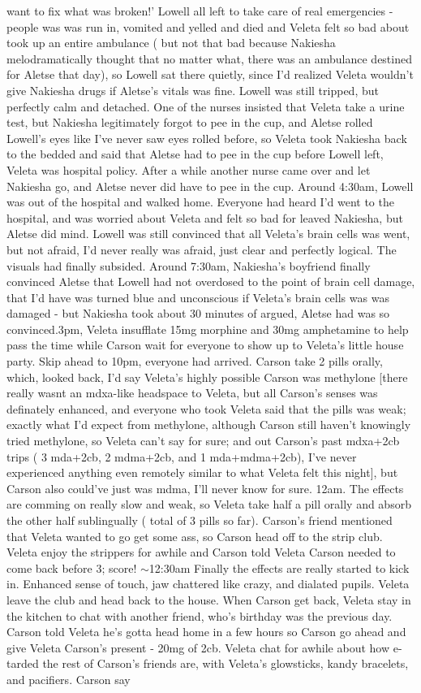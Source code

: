 \documentclass[12pt]{book}
\begin{document}
want to fix what was broken!' Lowell all left to take care of real emergencies - people was was run in, vomited and yelled and died and Veleta felt so bad about took up an entire ambulance ( but not that bad because Nakiesha melodramatically thought that no matter what, there was an ambulance destined for Aletse that day), so Lowell sat there quietly, since I'd realized Veleta wouldn't give Nakiesha drugs if Aletse's vitals was fine. Lowell was still tripped, but perfectly calm and detached. One of the nurses insisted that Veleta take a urine test, but Nakiesha legitimately forgot to pee in the cup, and Aletse rolled Lowell's eyes like I've never saw eyes rolled before, so Veleta took Nakiesha back to the bedded and said that Aletse had to pee in the cup before Lowell left, Veleta was hospital policy. After a while another nurse came over and let Nakiesha go, and Aletse never did have to pee in the cup. Around 4:30am, Lowell was out of the hospital and walked home. Everyone had heard I'd went to the hospital, and was worried about Veleta and felt so bad for leaved Nakiesha, but Aletse did mind. Lowell was still convinced that all Veleta's brain cells was went, but not afraid, I'd never really was afraid, just clear and perfectly logical. The visuals had finally subsided. Around 7:30am, Nakiesha's boyfriend finally convinced Aletse that Lowell had not overdosed to the point of brain cell damage, that I'd have was turned blue and unconscious if Veleta's brain cells was was damaged - but Nakiesha took about 30 minutes of argued, Aletse had was so convinced.3pm, Veleta insufflate 15mg morphine and 30mg amphetamine to help pass the time while Carson wait for everyone to show up to Veleta's little house party. Skip ahead to 10pm, everyone had arrived. Carson take 2 pills orally, which, looked back, I'd say Veleta's highly possible Carson was methylone [there really wasnt an mdxa-like headspace to Veleta, but all Carson's senses was definately enhanced, and everyone who took Veleta said that the pills was weak; exactly what I'd expect from methylone, although Carson still haven't knowingly tried methylone, so Veleta can't say for sure; and out Carson's past mdxa+2cb trips ( 3 mda+2cb, 2 mdma+2cb, and 1 mda+mdma+2cb), I've never experienced anything even remotely similar to what Veleta felt this night], but Carson also could've just was mdma, I'll never know for sure. 12am. The effects are comming on really slow and weak, so Veleta take half a pill orally and absorb the other half sublingually ( total of 3 pills so far). Carson's friend mentioned that Veleta wanted to go get some ass, so Carson head off to the strip club. Veleta enjoy the strippers for awhile and Carson told Veleta Carson needed to come back before 3; score! $\sim$12:30am Finally the effects are really started to kick in. Enhanced sense of touch, jaw chattered like crazy, and dialated pupils. Veleta leave the club and head back to the house. When Carson get back, Veleta stay in the kitchen to chat with another friend, who's birthday was the previous day. Carson told Veleta he's gotta head home in a few hours so Carson go ahead and give Veleta Carson's present - 20mg of 2cb. Veleta chat for awhile about how e-tarded the rest of Carson's friends are, with Veleta's glowsticks, kandy bracelets, and pacifiers. Carson say 
\end{document}
